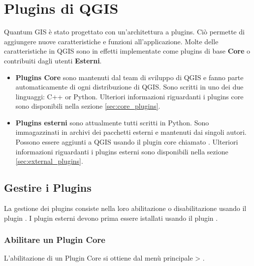 
\section{Plugins di QGIS}\label{sec:plugins}


Quantum GIS è stato progettato con un'architettura a plugins. Ciò permette di aggiungere nuove caratteristiche e funzioni all'applicazione. Molte delle caratteristiche in QGIS sono in effetti implementate come plugins di base \textbf{Core} o contribuiti dagli utenti \textbf{Esterni}. 

\begin{itemize}
\item \textbf{Plugins Core} sono mantenuti dal team di sviluppo di QGIS e fanno parte automaticamente di ogni distribuzione di QGIS.
Sono scritti in uno dei due linguaggi: C++ or Python.
Ulteriori informazioni riguardanti i plugins core sono disponibili nella sezione  \ref{sec:core_plugins}.
\item \textbf{Plugins esterni} sono attualmente tutti scritti in Python.
Sono immagazzinati in archivi dei pacchetti esterni e mantenuti dai singoli autori.
Possono essere aggiunti a QGIS usando il plugin core chiamato .
Ulteriori informazioni riguardanti i plugins esterni sono disponibili nella sezione \ref{sec:external_plugins}.
\end{itemize}

\subsection{Gestire i Plugins}\label{sec:managing_plugins}

La gestione dei plugins consiste nella loro abilitazione o disabilitazione usando il plugin .
I plugin esterni devono prima essere istallati usando  il plugin .

\subsubsection{Abilitare un Plugin Core}\label{sec:load_core_plugin} 

L'abilitazione di un Plugin Core si ottiene dal menù principale  > .

